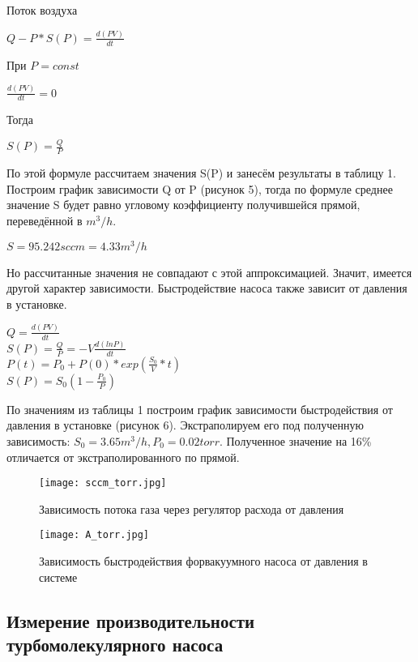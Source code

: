 \documentclass{article}
\begin{document}
Поток воздуха 
\begin{center}
$Q-P*S(P)=\frac{d(PV)}{dt}$
\end{center}
При $P = const$
\begin{center}
$\frac{d(PV)}{dt}=0$
\end{center}
Тогда
\begin{center}
$S(P)=\frac{Q}{P}$
\end{center}

По этой формуле рассчитаем значения S(P) и занесём результаты в таблицу 1. Построим график зависимости Q от P (рисунок 5), тогда по формуле среднее значение S будет равно угловому коэффициенту получившейся прямой, переведённой в $m^3/h$. 
\begin{center}
$S = 95.242 sccm = 4.33 m^3/h$
\end{center}

Но рассчитанные значения не совпадают с этой аппроксимацией. Значит, имеется другой характер зависимости.
Быстродействие насоса также зависит от давления в установке.

\begin{center}
$Q = \frac{d(PV)}{dt}$\\
$S(P) = \frac{Q}{P}=-V\frac{d(lnP)}{dt}$\\
$P(t) = P_0+P(0)*exp(\frac{S_0}{V}*t)$\\
$S(P) = S_0(1-\frac{P_0}{P})$
\end{center}

По значениям из таблицы 1 построим график зависимости быстродействия от давления в установке (рисунок 6). Экстраполируем его под полученную зависимость: $S_0 = 3.65 m^3/h, P_0 = 0.02 torr$. Полученное значение на 16\% отличается от экстраполированного по прямой.



\begin{figure}[H]
    \centering
    \texttt{[image: sccm\_torr.jpg]}
    \caption{Зависимость потока газа через регулятор расхода от давления}
    \label{fig:vac}
\end{figure}

\begin{figure}[H]
    \centering
    \texttt{[image: A\_torr.jpg]}
    \caption{Зависимость быстродействия форвакуумного насоса от давления в системе}
    \label{fig:vac}
\end{figure}

\subsection{Измерение производительности турбомолекулярного насоса}
\end{document}
